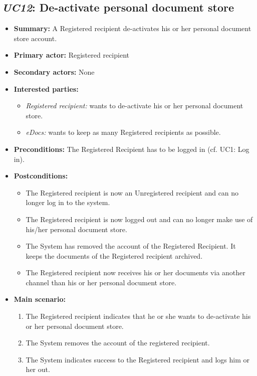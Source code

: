 \documentclass[a4paper,10pt]{article}
\begin{document}
\subsection{\emph{UC12}: De-activate personal document store}
\begin{itemize}
	\item \textbf{Summary:} A Registered recipient de-activates his or her personal document store account.
    \item \textbf{Primary actor:} Registered recipient
    \item \textbf{Secondary actors:} None
    \item \textbf{Interested parties:}
        \begin{itemize}
            \item \textit{Registered recipient:} wants to de-activate his or her personal document store.
            \item \textit{eDocs:} wants to keep as many Registered recipients as possible.
        \end{itemize}

    \item \textbf{Preconditions:} The Registered Recipient has to be logged in (cf. UC1: Log in).

    \item \textbf{Postconditions:}
        \begin{itemize}
            \item The Registered recipient is now an Unregistered recipient and can no longer log in to the system.
            \item The Registered recipient is now logged out and can no longer make use of his/her personal document store.
            \item The System has removed the account of the Registered Recipient. It keeps the documents of the Registered recipient archived.
            \item The Registered recipient now receives his or her documents via another channel than his or her personal document store.
        \end{itemize}
        
    \item \textbf{Main scenario:} 
    \begin{enumerate}
       \item The Registered recipient indicates that he or she wants to de-activate his or her personal document store.
       \item The System removes the account of the registered recipient.
       \item The System indicates success to the Registered recipient and logs him or her out.
    \end{enumerate}
\end{itemize}
\end{document}
